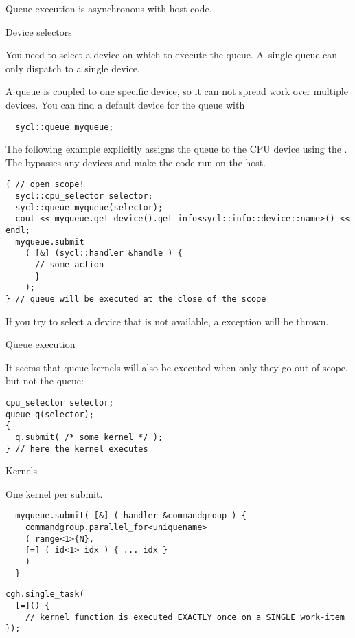 Queue execution is asynchronous with host code.

 {Device selectors}

You need to select a device on which to execute the queue.
A~single queue can only dispatch to a single device.

A queue is coupled to one specific device,
so it can not spread work over multiple devices.
You can find a default device for the queue with
\begin{lstlisting}
  sycl::queue myqueue;
\end{lstlisting}

The following example explicitly assigns the queue to the CPU device
using the .
The  bypasses any devices and
make the code run on the host.



\begin{lstlisting}
{ // open scope!
  sycl::cpu_selector selector;
  sycl::queue myqueue(selector);
  cout << myqueue.get_device().get_info<sycl::info::device::name>() << endl;
  myqueue.submit
    ( [&] (sycl::handler &handle ) {
      // some action
      }
    );
} // queue will be executed at the close of the scope
\end{lstlisting}

If you try to select a device that is not available,
a  exception will be thrown.

 {Queue execution}

It seems that queue kernels will also be executed when only they
go out of scope, but not the queue:
\begin{lstlisting}
cpu_selector selector;
queue q(selector);
{
  q.submit( /* some kernel */ );
} // here the kernel executes
\end{lstlisting}

 {Kernels}

One kernel per submit.

\begin{lstlisting}
  myqueue.submit( [&] ( handler &commandgroup ) {
    commandgroup.parallel_for<uniquename> 
    ( range<1>{N},
    [=] ( id<1> idx ) { ... idx }
    )
  }
\end{lstlisting}




\begin{lstlisting}
cgh.single_task(
  [=]() {
    // kernel function is executed EXACTLY once on a SINGLE work-item
});
\end{lstlisting}

